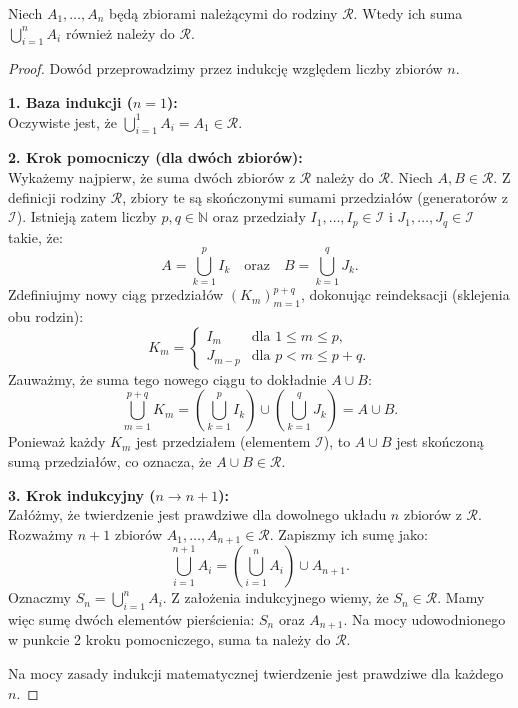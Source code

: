 \begin{lemma}
    Niech $A_1, \dots, A_n$ będą zbiorami należącymi do rodziny $\mathcal{R}$. Wtedy ich suma $\bigcup_{i=1}^{n} A_i$ również należy do $\mathcal{R}$.
\end{lemma} 
\begin{proof}
	    Dowód przeprowadzimy przez indukcję względem liczby zbiorów $n$.

    \textbf{1. Baza indukcji ($n=1$):} \\
    Oczywiste jest, że $\bigcup_{i=1}^{1} A_i = A_1 \in \mathcal{R}$.

    \textbf{2. Krok pomocniczy (dla dwóch zbiorów):} \\
    Wykażemy najpierw, że suma dwóch zbiorów z $\mathcal{R}$ należy do $\mathcal{R}$.
    Niech $A, B \in \mathcal{R}$. Z definicji rodziny $\mathcal{R}$, zbiory te są skończonymi sumami przedziałów (generatorów z $\mathcal{I}$). Istnieją zatem liczby $p, q \in \mathbb{N}$ oraz przedziały $I_1, \dots, I_p \in \mathcal{I}$ i $J_1, \dots, J_q \in \mathcal{I}$ takie, że:
    \[
        A = \bigcup_{k=1}^{p} I_k \quad \text{oraz} \quad B = \bigcup_{k=1}^{q} J_k.
    \]
    Zdefiniujmy nowy ciąg przedziałów $(K_m)_{m=1}^{p+q}$, dokonując reindeksacji (sklejenia obu rodzin):
    \[
        K_m = 
        \begin{cases}
            I_m & \text{dla } 1 \le m \le p, \\
            J_{m-p} & \text{dla } p < m \le p+q.
        \end{cases}
    \]
    Zauważmy, że suma tego nowego ciągu to dokładnie $A \cup B$:
    \[
        \bigcup_{m=1}^{p+q} K_m = \left( \bigcup_{k=1}^p I_k \right) \cup \left( \bigcup_{k=1}^q J_k \right) = A \cup B.
    \]
    Ponieważ każdy $K_m$ jest przedziałem (elementem $\mathcal{I}$), to $A \cup B$ jest skończoną sumą przedziałów, co oznacza, że $A \cup B \in \mathcal{R}$.

    \textbf{3. Krok indukcyjny ($n \to n+1$):} \\
    Załóżmy, że twierdzenie jest prawdziwe dla dowolnego układu $n$ zbiorów z $\mathcal{R}$. Rozważmy $n+1$ zbiorów $A_1, \dots, A_{n+1} \in \mathcal{R}$.
    Zapiszmy ich sumę jako:
    \[
        \bigcup_{i=1}^{n+1} A_i = \left( \bigcup_{i=1}^{n} A_i \right) \cup A_{n+1}.
    \]
    Oznaczmy $S_n = \bigcup_{i=1}^{n} A_i$. Z założenia indukcyjnego wiemy, że $S_n \in \mathcal{R}$.
    Mamy więc sumę dwóch elementów pierścienia: $S_n$ oraz $A_{n+1}$.
    Na mocy udowodnionego w punkcie 2 kroku pomocniczego, suma ta należy do $\mathcal{R}$.
    
    Na mocy zasady indukcji matematycznej twierdzenie jest prawdziwe dla każdego $n$.
\end{proof} 

